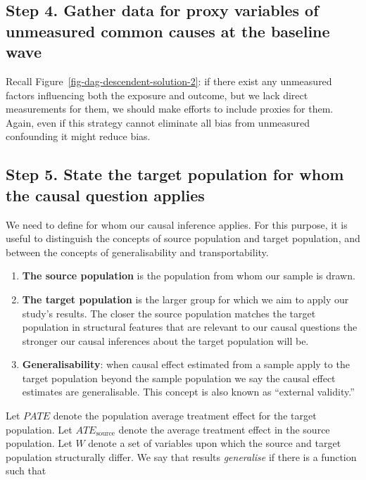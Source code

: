 \documentclass[
  singlecolumn]{report}
\begin{document}
\hypertarget{step-4.-gather-data-for-proxy-variables-of-unmeasured-common-causes-at-the-baseline-wave}{%
\subsection{Step 4. Gather data for proxy variables of unmeasured common
causes at the baseline
wave}\label{step-4.-gather-data-for-proxy-variables-of-unmeasured-common-causes-at-the-baseline-wave}}

Recall Figure~\ref{fig-dag-descendent-solution-2}: if there exist any
unmeasured factors influencing both the exposure and outcome, but we
lack direct measurements for them, we should make efforts to include
proxies for them. Again, even if this strategy cannot eliminate all bias
from unmeasured confounding it might reduce bias.

\hypertarget{step-5.-state-the-target-population-for-whom-the-causal-question-applies}{%
\subsection{Step 5. State the target population for whom the causal
question
applies}\label{step-5.-state-the-target-population-for-whom-the-causal-question-applies}}

We need to define for whom our causal inference applies. For this
purpose, it is useful to distinguish the concepts of source population
and target population, and between the concepts of generalisability and
transportability.

\begin{enumerate}
\def\labelenumi{\arabic{enumi}.}
\item
  \textbf{The source population} is the population from whom our sample
  is drawn.
\item
  \textbf{The target population} is the larger group for which we aim to
  apply our study's results. The closer the source population matches
  the target population in structural features that are relevant to our
  causal questions the stronger our causal inferences about the target
  population will be.
\item
  \textbf{Generalisability}: when causal effect estimated from a sample
  apply to the target population beyond the sample population we say the
  causal effect estimates are generalisable. This concept is also known
  as ``external validity.''
\end{enumerate}

Let \(PATE\) denote the population average treatment effect for the
target population. Let \(ATE_{\text{source}}\) denote the average
treatment effect in the source population. Let \(W\) denote a set of
variables upon which the source and target population structurally
differ. We say that results \emph{generalise} if there is a function
such that
\end{document}
